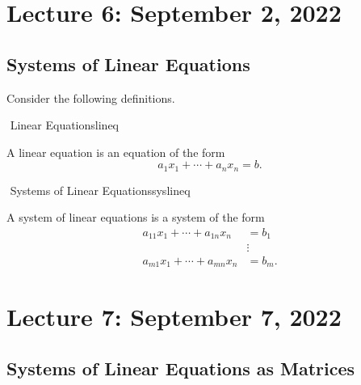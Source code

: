 \section{Lecture 6: September 2, 2022}

    \subsection{Systems of Linear Equations}
    
        Consider the following definitions.
        \begin{definition}{\Stop\,\,Linear Equations}{lineq}
        
            A linear equation is an equation of the form 
            \begin{equation*}
                a_1x_1+\cdots+a_nx_n=b.
            \end{equation*}
            
        \end{definition}
        \begin{definition}{\Stop\,\,Systems of Linear Equations}{syslineq}
        
            A system of linear equations is a system of the form 
            \begin{align*}
                a_{11}x_1+\cdots+a_{1n}x_n&=b_1 \\
                &\vdots \\
                a_{m1}x_1+\cdots+a_{mn}x_n&=b_m.
            \end{align*}
            
        \end{definition}
        \pagebreak
        
\pagebreak
        
\section{Lecture 7: September 7, 2022}

    \subsection{Systems of Linear Equations as Matrices}

